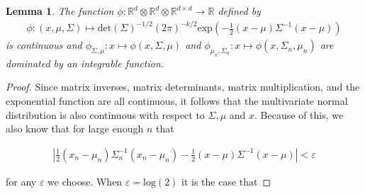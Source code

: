 \documentclass{article}
\newtheorem{lemma}[theorem]{Lemma}
\begin{document}
\begin{lemma}
	\label{lemma:dom_measure}
	The function $\phi : \mathbb{R}^d \otimes \mathbb{R}^d \otimes \mathbb{R}^{d \times d} \to \mathbb{R}$ defined by
\begin{align*}
	\phi : (x, \mu, \Sigma) \mapsto \text{det}(\Sigma)^{-1/2}(2\pi)^{-k/2}\text{exp}\left( - \frac{1}{2}(x- \mu)\Sigma^{-1}(x- \mu)\right)
\end{align*}
	is continuous and $\phi_{\Sigma, \mu} : x \mapsto \phi(x, \Sigma, \mu)$ and $\phi_{\mu_n, \Sigma_n} : x \mapsto \phi(x, \Sigma_n, \mu_n)$ are dominated by an integrable function.
\end{lemma}

\begin{proof}
Since matrix inverses, matrix determinants, matrix multiplication, and the exponential function are all continuous, it follows that the multivariate normal distribution is also continuous with respect to $\Sigma, \mu$ and $x$.  Because of this, we also know that for large enough $n$ that 

\begin{align*}
\left|\frac{1}{2}(x_n - \mu_n)\Sigma_n^{-1}(x_n - \mu_n) - \frac{1}{2}(x - \mu)\Sigma^{-1}(x - \mu)\right| < \varepsilon
\end{align*}

for any $\varepsilon$ we choose.  When $\varepsilon = \text{log}(2)$ it is the case that 



\end{proof}
\end{document}
